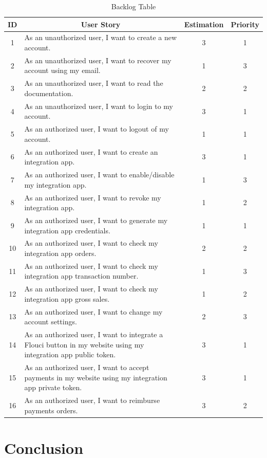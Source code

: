 \begin{spacing}{1.2}
\begin{table}[H]
\centering
\caption{Backlog Table}
\begin{tabularx}{\linewidth}{|c|X|c|c|}
\hline
ID & \multicolumn{1}{c|}{User Story} & Estimation & Priority \\ \hline
1 & As an unauthorized user, I want to create a new account. &  3 & 1  \\  \hline
2 & As an unauthorized user, I want to recover my account using my email. &  1 & 3 \\ \hline
3 & As an unauthorized user, I want to read the documentation. & 2 & 2 \\ \hline
4 & As an unauthorized user, I want to login to my account. & 3 & 1 \\ \hline
5 & As an authorized user, I want to logout of my account. & 1 & 1 \\ \hline
6 & As an authorized user, I want to create an integration app. & 3 & 1 \\ \hline
7 & As an authorized user, I want to  enable/disable my integration app. & 1 & 3 \\ \hline
8 & As an authorized user, I want to  revoke my integration app. & 1 & 2 \\ \hline
9 & As an authorized user, I want to  generate my integration app credentials. & 1 & 1 \\ \hline
10 & As an authorized user, I want to check my integration app orders. & 2 & 2 \\ \hline
11 & As an authorized user, I want to check my integration app transaction number. & 1 & 3 \\ \hline
12 & As an authorized user, I want to check my integration app gross sales. & 1 & 2 \\ \hline
13 & As an authorized user, I want to change my account settings. & 2 & 3 \\ \hline
14 & As an authorized user, I want to integrate a Flouci button in my website using my integration app public token. & 3 & 1 \\ \hline
15 & As an authorized user, I want to accept payments in my website using my integration app private token. & 3 & 1 \\ \hline
16 & As an authorized user, I want to reimburse payments orders. & 3 & 2 \\ \hline
\end{tabularx}
\end{table}

\section*{Conclusion}


\end{spacing}
